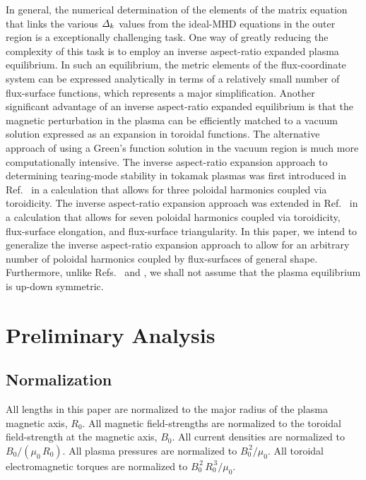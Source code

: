 \documentclass[12pt,prb,aps]{revtex4-1}
\begin{document}
In general, the  numerical determination of the elements of the matrix equation that links the various ${\mit\Delta}_k$ values from the ideal-MHD equations 
in the outer region is a exceptionally challenging task.\cite{nish,pletz,am2,aglas,aglas1}
One way of greatly reducing the complexity of this task is to employ an inverse aspect-ratio expanded plasma equilibrium.\cite{greene} In such an equilibrium,
the metric elements of the flux-coordinate system can be expressed analytically in terms of a relatively small number of  flux-surface functions,
which represents a major simplification.\cite{con0} Another significant advantage of an inverse aspect-ratio expanded equilibrium is that the magnetic perturbation in the plasma can be efficiently 
matched to a vacuum solution  expressed as an expansion in toroidal functions.\cite{am1} The alternative approach of using a Green's
function solution in the vacuum region is much more computationally intensive.\cite{chance,xu} The inverse aspect-ratio expansion approach to determining tearing-mode stability in tokamak plasmas 
was first introduced in Ref.~ in a calculation that allows for three  poloidal harmonics coupled via toroidicity. The
inverse aspect-ratio expansion approach was extended in Ref.~ in a calculation that allows for seven poloidal harmonics coupled via toroidicity, flux-surface elongation, and
flux-surface triangularity. In this paper, we intend to generalize the inverse aspect-ratio expansion  approach to allow for an arbitrary number of poloidal harmonics coupled
by flux-surfaces of general shape. Furthermore, unlike Refs.~ and , we shall not assume that the plasma
equilibrium 
is up-down symmetric. 

\section{Preliminary Analysis}
\subsection{Normalization}\label{coords}
All lengths in this paper are normalized to  the major radius of the plasma magnetic axis, $R_0$. All magnetic field-strengths
are normalized to the  toroidal field-strength at the magnetic axis, $B_0$. All current densities are normalized to $B_0/(\mu_0\,R_0)$. All plasma pressures are normalized to $B_0^{\,2}/\mu_0$.
All toroidal electromagnetic torques are normalized to $B_0^{\,2}\,R_0^{\,3}/\mu_0$. 
\end{document}
